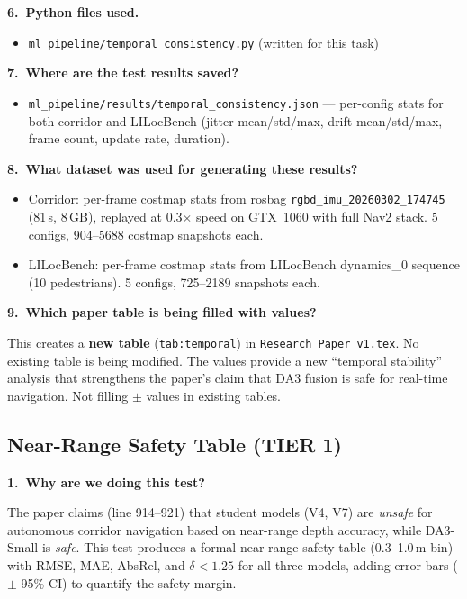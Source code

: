 \documentclass[11pt,a4paper]{article}
\begin{document}
\textbf{6.\ Python files used.}

\begin{itemize}[nosep]
  \item \texttt{ml\_pipeline/temporal\_consistency.py} (written for this task)
\end{itemize}

\textbf{7.\ Where are the test results saved?}

\begin{itemize}[nosep]
  \item \texttt{ml\_pipeline/results/temporal\_consistency.json}
    --- per-config stats for both corridor and LILocBench
    (jitter mean/std/max, drift mean/std/max, frame count,
    update rate, duration).
\end{itemize}

\textbf{8.\ What dataset was used for generating these results?}

\begin{itemize}[nosep]
  \item Corridor: per-frame costmap stats from rosbag
    \texttt{rgbd\_imu\_20260302\_174745} (81\,s, 8\,GB), replayed
    at 0.3$\times$ speed on GTX~1060 with full Nav2 stack.
    5 configs, 904--5688 costmap snapshots each.
  \item LILocBench: per-frame costmap stats from LILocBench
    dynamics\_0 sequence (10 pedestrians). 5 configs,
    725--2189 snapshots each.
\end{itemize}

\textbf{9.\ Which paper table is being filled with values?}

This creates a \textbf{new table} (\texttt{tab:temporal}) in
\texttt{Research Paper v1.tex}. No existing table is being modified.
The values provide a new ``temporal stability'' analysis that
strengthens the paper's claim that DA3 fusion is safe for real-time
navigation. Not filling $\pm$ values in existing tables.

\subsection{Near-Range Safety Table (TIER 1)}
\label{sec:nearrange-safety}

\textbf{1.\ Why are we doing this test?}

The paper claims (line 914--921) that student models (V4, V7) are
\emph{unsafe} for autonomous corridor navigation based on near-range
depth accuracy, while DA3-Small is \emph{safe}. This test produces a
formal near-range safety table (0.3--1.0\,m bin) with RMSE, MAE,
AbsRel, and $\delta < 1.25$ for all three models, adding error bars
($\pm$ 95\% CI) to quantify the safety margin.
\end{document}
